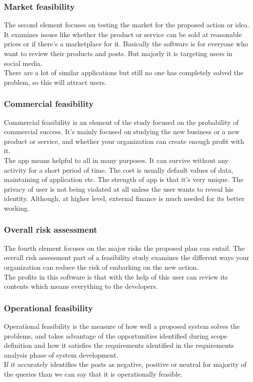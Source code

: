 \subsubsection{Market feasibility}
The second element focuses on testing the market for the proposed action or idea. It examines issues like whether the product or service can be sold at reasonable prices or if there’s a marketplace for it. Basically the software is for everyone who want to review their products and posts. But majorly it is targeting users in social media.\\
There are a lot of similar applications but still no one has completely solved the problem, so this will attract users.

\subsubsection{Commercial feasibility}
Commercial feasibility is an element of the study focused on the probability of commercial success. It’s mainly focused on studying the new business or a new product or service, and whether your organization can create enough profit with it.
\\
The app means helpful to all in many purposes. It can survive without any activity for a short period of time. The cost is usually default values of data, maintaining of application etc. The strength of app is that it’s very unique. The privacy of user is not being violated at all unless the user wants to reveal his identity. Although, at higher level, external finance is much needed for its better working.

\subsubsection{Overall risk assessment}
The fourth element focuses on the major risks the proposed plan can entail. The overall risk assessment part of a feasibility study examines the different ways your organization can reduce the risk of embarking on the new action.\\
The profits in this software is that with the help of this user can review its contents which means everything to the developers.

\subsubsection{Operational feasibility}
Operational feasibility is the measure of how well a proposed system solves the problems, and takes advantage of the opportunities identified during scope definition and how it satisfies the requirements identified in the requirements analysis phase of system development.\\
If it accurately identifies the posts as negative, positive or neutral  for majority of the queries than we can say that it is operationally feasible. 

